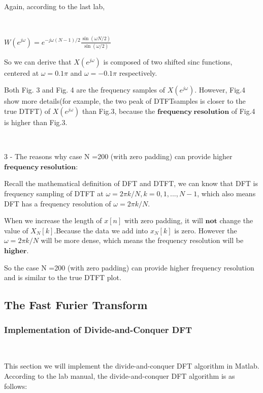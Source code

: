\documentclass[journal]{IEEEtran}
\begin{document}
Again, according to the last lab,

$~$

\(\displaystyle W\left(e^{j \omega}\right)=e^{-j \omega(N-1) / 2} \frac{\sin (\omega N / 2)}{\sin (\omega / 2)}\)

So we can derive that $X(e^{j\omega})$ is composed of two shifted sinc functions, centered at $\omega = 0.1\pi$ and $\omega = -0.1\pi$ respectively.

Both Fig. 3 and Fig. 4 are the frequency samples of $X(e^{j\omega})$. 
However, Fig.4 show more details(for example, the two peak of DTFTsamples is closer to the true DTFT) of $X(e^{j\omega})$ than Fig.3, because the $\mathbf{frequency~resolution}$ of Fig.4 is higher than Fig.3.

$~$

\textcolor[rgb]{0,0.6,1}{3 -} The reasons why case N =200 (with zero padding) can provide higher $\mathbf{frequency~resolution}$:


Recall the mathematical definition of DFT and DTFT, we can know that DFT is frequency sampling of DTFT at $\omega=2\pi k/N, k=0,1,...,N-1$, which also means DFT has a frequency resolution of $\omega=2\pi k/N$.

When we increase the length of $x[n]$ with zero padding, it will $\mathbf{not}$ change the value of $X_N[k]$.Because the data we add into $x_N[k]$ is zero.
However the $\omega=2\pi k/N$ will be more dense, which means the frequency resolution will be $\mathbf{higher}$.

So the case N =200 (with zero padding) can provide higher frequency resolution and is similar to the true DTFT plot.

\subsection{The Fast Furier Transform}
\subsubsection{Implementation of Divide-and-Conquer DFT}
$~$

This section we will implement the divide-and-conquer DFT algorithm in Matlab.
 According to the lab manual, the divide-and-conquer DFT algorithm is as follows:
\end{document}
